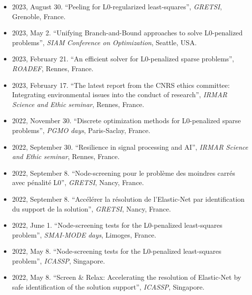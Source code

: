 \begin{itemize}
    \item 2023, August 30. ``Peeling for L0-regularized least-squares'', \textit{GRETSI}, Grenoble, France.
    \item 2023, May 2. ``Unifying Branch-and-Bound approaches to solve L0-penalized problems'', \textit{SIAM Conference on Optimization}, Seattle, USA.
    \item 2023, February 21. ``An efficient solver for L0-penalized sparse problems'', \textit{ROADEF}, Rennes, France.
    \item 2023, February 17. ``The latest report from the CNRS ethics committee: Integrating environmental issues into the conduct of research'', \textit{IRMAR Science and Ethic seminar}, Rennes, France.
    \item 2022, November 30. ``Discrete optimization methods for L0-penalized sparse problems'', \textit{PGMO days}, Paris-Saclay, France.
    \item 2022, September 30. ``Resilience in signal processing and AI'', \textit{IRMAR Science and Ethic seminar}, Rennes, France.
    \item 2022, September 8. ``Node-screening pour le problème des moindres carrés avec pénalité L0'', \textit{GRETSI}, Nancy, France.
    \item 2022, September 8. ``Accélérer la résolution de l’Elastic-Net par identification du support de la solution'', \textit{GRETSI}, Nancy, France.
    \item 2022, June 1. ``Node-screening tests for the L0-penalized least-squares problem'', \textit{SMAI-MODE days}, Limoges, France.
    \item 2022, May 8. ``Node-screening tests for the L0-penalized least-squares problem'', \textit{ICASSP}, Singapore.
    \item 2022, May 8. ``Screen \& Relax: Accelerating the resolution of Elastic-Net by safe identification of the solution support'', \textit{ICASSP}, Singapore.
\end{itemize}